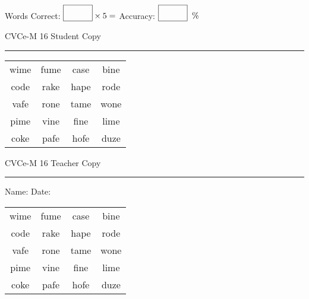 \documentclass{memoir}
\begin{document}
\small

Words Correct: $\fbox{\phantom{\huge 100}} \times 5 = $ Accuracy: $\fbox{\phantom{\huge 100}}\;\; \%$ 

\vfill

\newpage


\footnotesize \noindent
CVCe-M 16 \hfill Student Copy
\smallskip
\hrule

\Large

\setlength{\tabcolsep}{14pt}
\def\arraystretch{2}

{\selectfont


\begin{vplace}[0.5]
\begin{center}
\begin{tabular}{cccc}
wime & fume & case & bine \\
code & rake & hape & rode \\
vafe & rone & tame & wone \\
pime & vine & fine & lime \\
coke & pafe & hofe & duze \\
\end{tabular}
\end{center}
\end{vplace}

}

\newpage

\footnotesize \noindent
CVCe-M 16 \hfill Teacher Copy
\smallskip
\hrule

\small

\vfill

\noindent
Name: \underline{\hspace{1.75in}} \hfill Date: \underline{\hspace{1in}}

\Large

{\selectfont


\begin{vplace}[0.5]
\begin{center}
\begin{tabular}{cccc}
wime & fume & case & bine \\
code & rake & hape & rode \\
vafe & rone & tame & wone \\
pime & vine & fine & lime \\
coke & pafe & hofe & duze \\
\end{tabular}
\end{center}
\end{vplace}



}
\end{document}
